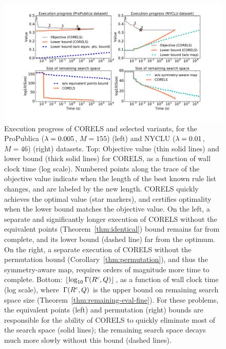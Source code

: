 \begin{figure}[t!]
\begin{center}
\includegraphics[trim={34mm, 20mm, 34mm, 10mm},
width=\textwidth]{figs/weapon_execution_large-remaining-space.pdf}
\end{center}
\caption{Execution progress of CORELS and selected variants,
for the ProPublica (${{\lambda} = 0.005}$, ${M = 155}$) (left)
and NYCLU (${{\lambda} = 0.01}$, ${M = 46}$) (right) datasets.
%
Top: Objective value (thin solid lines) and lower bound (thick solid lines) for CORELS,
as a function of wall clock time (log scale).
%
Numbered points along the trace of the objective value
indicate when the length of the best known rule list changes,
and are labeled by the new length.
%
CORELS quickly achieves the optimal value (star markers),
and certifies optimality when the lower bound matches the objective value.
%
On the left, a separate and significantly longer execution of CORELS
without the equivalent points  (Theorem~\ref{thm:identical}) bound remains
far from complete, and its lower bound (dashed line) far from the optimum.
%
On the right, a separate execution of CORELS without the permutation bound
(Corollary~\ref{thm:permutation}), and thus the symmetry-aware map,
requires orders of magnitude more time to complete.
%
Bottom: $\lfloor \log_{10} \Gamma({R^c}, Q) \rfloor$,
as a function of wall clock time (log scale),
where~$\Gamma({R^c}, Q)$
is the upper bound on remaining search space size
(Theorem~\ref{thm:remaining-eval-fine}).
%
For these problems, the equivalent points (left) and
permutation (right) bounds are responsible for the ability of
CORELS to quickly eliminate most of the search space (solid lines);
the remaining search space decays much more slowly without this bound (dashed lines).
}
\label{fig:objective}
\end{figure}

